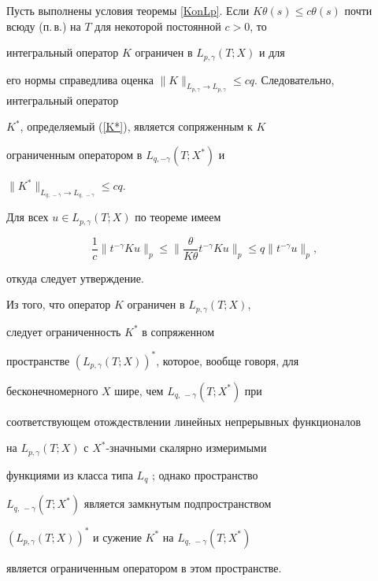 \begin{cors} \label{KinLp}


Пусть выполнены условия теоремы \ref{KonLp}. Если $K\theta(s) \le


c \theta(s)$ почти всюду (п.\,в.) на $T$ для некоторой постоянной $c>0$, то


интегральный оператор $K$ ограничен в $L_{p,\gamma}(T;X)$ и для


его нормы справедлива оценка $\|K\|_{L_{p,\gamma} \to


L_{p,\gamma}} \le c q$. Следовательно, интегральный оператор


$K^*$, определяемый (\ref{K*}), является сопряженным к $K$


ограниченным оператором в $L_{q,-\gamma}(T;X^*)$ и


$\|K^*\|_{L_{q,\,-\gamma} \to L_{q,\,-\gamma}} \le c q$.


\end{cors}





\begin{pf}


Для всех $u \in L_{p,\gamma}(T;X)$ по теореме имеем


$$


\frac{1}{c}\|t^{-\gamma} K u \|_p \le \bigg\|\frac{\theta}{K


\theta} t^{-\gamma} K u \bigg\|_p \le q \|t^{-\gamma}u\|_p,


$$


откуда следует утверждение.


\end{pf}





\begin{notenonum}


Из того, что оператор $K$ ограничен в $L_{p,\gamma}(T;X)$,


следует ограниченность $K^*$ в сопряженном


пространстве $(L_{p,\gamma}(T;X))^*$, которое, вообще говоря, для


бесконечномерного $X$ шире, чем $L_{q,\,-\gamma}(T;X^*)$ при


соответствующем отождествлении линейных непрерывных функционалов


на $L_{p,\gamma}(T;X)$ с $X^*$-значными скалярно измеримыми


функциями из класса типа $L_q$ \cite{Tulcea}; однако пространство


$L_{q,\,-\gamma}(T;X^*)$ является замкнутым подпространством


$(L_{p,\gamma}(T;X))^*$ и сужение $K^*$ на $L_{q,\,-\gamma}(T;X^*)$


является ограниченным оператором в этом пространстве.


\end{notenonum}





